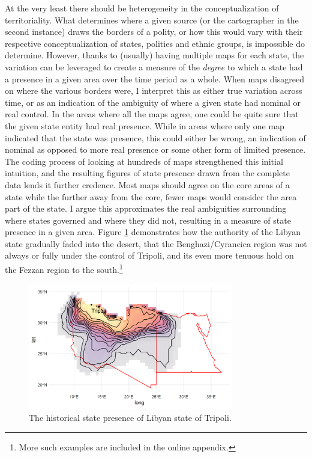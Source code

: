 \documentclass[12pt]{article}
\begin{document}
At the very least there should be heterogeneity in the conceptualization of
territoriality. What determines where a given source (or the cartographer in the
second instance) draws the borders of a polity, or how this would vary with
their respective conceptualization of states, polities and ethnic groups, is
impossible do determine. However, thanks to (usually) having multiple maps for
each state, the variation can be leveraged to create a measure of the
\textit{degree} to which a state had a presence in a given area over the time
period as a whole. When maps disagreed on where the various borders were, I
interpret this as either true variation across time, or as an indication of the
ambiguity of where a given state had nominal or real control. In the areas where
all the maps agree, one could be quite sure that the given state entity had real
presence.  While in areas where only one map indicated that the state was
presence, this could either be wrong, an indication of nominal as opposed to
more real presence or some other form of limited presence. The coding process of
looking at hundreds of maps strengthened this initial intuition, and the
resulting figures of state presence drawn from the complete data lends it
further credence. Most maps should agree on the core areas of a state while the
further away from the core, fewer maps would consider the area part of the
state. I argue this approximates the real ambiguities surrounding where states
governed and where they did not, resulting in a measure of state presence in a
given area. Figure \ref{libya} demonstrates how the authority of the Libyan
state gradually faded into the desert, that the Benghazi/Cyraneica region was
not always or fully under the control of Tripoli, and its even more tenuous hold
on the Fezzan region to the south.\footnote{More such examples are included in
the online appendix.}


\begin{figure}[htpb]
	\centering
	\includegraphics[width=0.8\textwidth,keepaspectratio]{img/libya.png}
	\caption{The historical state presence of Libyan state of Tripoli.}
	\label{libya}
\end{figure}
\end{document}
